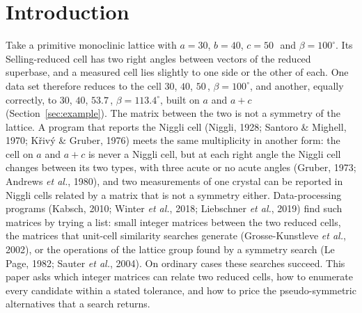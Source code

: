 \section{Introduction}

Take a primitive monoclinic lattice with $a=30$, $b=40$, $c=50$\,\Ang\ and $\beta=100^\circ$. Its Selling-reduced cell has two right angles between vectors of the reduced superbase, and a measured cell lies slightly to one side or the other of each. One data set therefore reduces to the cell $30$, $40$, $50$\,\Ang, $\beta=100^\circ$, and another, equally correctly, to $30$, $40$, $53.7$\,\Ang, $\beta=113.4^\circ$, built on $a$ and $a+c$ (Section~\ref{sec:example}). The matrix between the two is not a symmetry of the lattice. A program that reports the Niggli cell (Niggli, 1928; Santoro \& Mighell, 1970; K\v{r}iv\'y \& Gruber, 1976) meets the same multiplicity in another form: the cell on $a$ and $a+c$ is never a Niggli cell, but at each right angle the Niggli cell changes between its two types, with three acute or no acute angles (Gruber, 1973; Andrews \emph{et al.}, 1980), and two measurements of one crystal can be reported in Niggli cells related by a matrix that is not a symmetry either. Data-processing programs (Kabsch, 2010; Winter \emph{et al.}, 2018; Liebschner \emph{et al.}, 2019) find such matrices by trying a list: small integer matrices between the two reduced cells, the matrices that unit-cell similarity searches generate (Grosse-Kunstleve \emph{et al.}, 2002), or the operations of the lattice group found by a symmetry search (Le Page, 1982; Sauter \emph{et al.}, 2004). On ordinary cases these searches succeed. This paper asks which integer matrices can relate two reduced cells, how to enumerate every candidate within a stated tolerance, and how to price the pseudo-symmetric alternatives that a search returns.

